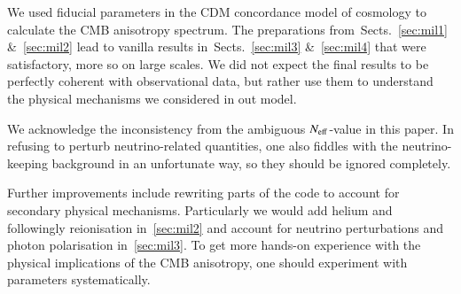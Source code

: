 




We used fiducial parameters in the \textLambda CDM concordance model of cosmology to calculate the CMB anisotropy spectrum. The preparations from~Sects.~\ref{sec:mil1} \&~\ref{sec:mil2} lead to vanilla results in~Sects.~\ref{sec:mil3} \&~\ref{sec:mil4} that were satisfactory, more so on large scales. We did not expect the final results to be perfectly coherent with observational data, but rather use them to understand the physical mechanisms we considered in out model.

We acknowledge the inconsistency from the ambiguous $N_\mathrm{eff}$-value in this paper. In refusing to perturb neutrino-related quantities, one also fiddles with the neutrino-keeping background in an unfortunate way, so they should be ignored completely.

Further improvements include rewriting parts of the code to account for secondary physical mechanisms. Particularly we would add helium and followingly reionisation in~\cref{sec:mil2} and account for neutrino perturbations and photon polarisation in~\cref{sec:mil3}. To get more hands-on experience with the physical implications of the CMB anisotropy, one should experiment with parameters systematically.